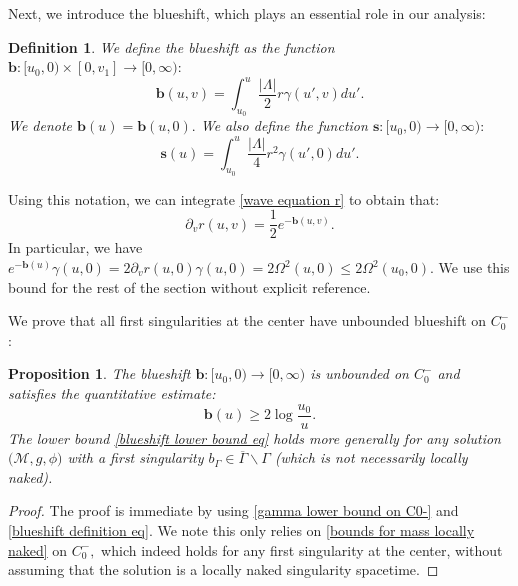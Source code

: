 \documentclass[11pt]{article}
\newtheorem{definition}{Definition}[section]
\newtheorem{proposition}{Proposition}[section]
\numberwithin{equation}{section}
\begin{document}
Next, we introduce the blueshift, which plays an essential role in our analysis:
\begin{definition}\label{blueshift definition}
    We define the blueshift as the function $\mathbf{b}:[u_0,0)\times[0,v_1]\rightarrow[0,\infty):$
    \begin{equation}\label{blueshift definition eq}
        \mathbf{b}(u,v)=\int_{u_0}^u\frac{|\Lambda|}{2}r\gamma(u',v)du'.
    \end{equation}
    We denote $\mathbf{b}(u)=\mathbf{b}(u,0).$ We also define the function $\mathbf{s}:[u_0,0)\rightarrow[0,\infty):$
    \begin{equation}\label{blueshift strength definition}
        \mathbf{s}(u)=\int_{u_0}^u\frac{|\Lambda|}{4}r^2\gamma(u',0)du'.
    \end{equation}
\end{definition}

Using this notation, we can integrate \eqref{wave equation r} to obtain that:
\begin{equation}\label{dv r in terms of blueshift}
        \partial_vr(u,v)=\frac{1}{2}e^{-\mathbf{b}(u,v)}.
\end{equation}
In particular, we have $e^{-\mathbf{b}(u)}\gamma(u,0)=2\partial_vr(u,0)\gamma(u,0)=2\Omega^2(u,0)\leq2\Omega^2(u_0,0).$ We use this bound for the rest of the section without explicit reference.

We prove that all first singularities at the center have unbounded blueshift on $C_0^-$:
\begin{proposition}\label{blueshift lower bound proposition}
    The blueshift $\mathbf{b}:[u_0,0)\rightarrow[0,\infty)$ is unbounded on $C_0^-$ and satisfies the quantitative estimate:
    \begin{equation}\label{blueshift lower bound eq}
        \mathbf{b}(u)\geq2\log\frac{u_0}{u}.
    \end{equation}
    The lower bound \eqref{blueshift lower bound eq} holds more generally for any solution $\big(\mathcal{M},g,\phi\big)$ with a first singularity $b_{\Gamma}\in\overline{\Gamma}\backslash\Gamma$  (which is not necessarily locally naked).
\end{proposition}
\begin{proof}
    The proof is immediate by using \eqref{gamma lower bound on C0-} and \eqref{blueshift definition eq}. We note this only relies on \eqref{bounds for mass locally naked} on $C_0^-,$ which indeed holds for any first singularity at the center, without assuming that the solution is a locally naked singularity spacetime.
\end{proof}
\end{document}
